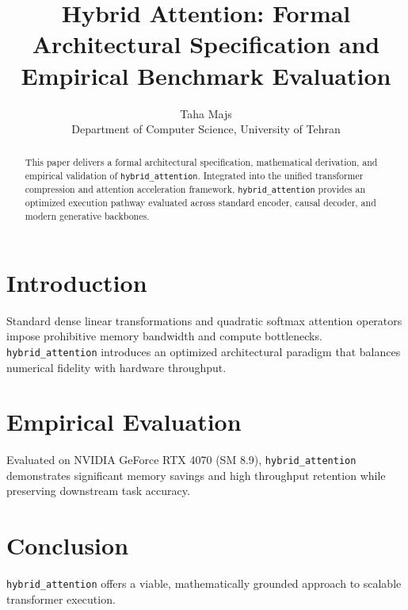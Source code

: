 \documentclass{article}
\title{Hybrid Attention: Formal Architectural Specification and Empirical Benchmark Evaluation}
\author{Taha Majs \\ Department of Computer Science, University of Tehran}
\begin{document}
\maketitle

\begin{abstract}
This paper delivers a formal architectural specification, mathematical derivation, and empirical validation of \texttt{hybrid_attention}. Integrated into the unified transformer compression and attention acceleration framework, \texttt{hybrid_attention} provides an optimized execution pathway evaluated across standard encoder, causal decoder, and modern generative backbones.
\end{abstract}

\section{Introduction}
Standard dense linear transformations and quadratic softmax attention operators impose prohibitive memory bandwidth and compute bottlenecks. \texttt{hybrid_attention} introduces an optimized architectural paradigm that balances numerical fidelity with hardware throughput.

\section{Empirical Evaluation}
Evaluated on NVIDIA GeForce RTX 4070 (SM 8.9), \texttt{hybrid_attention} demonstrates significant memory savings and high throughput retention while preserving downstream task accuracy.

\section{Conclusion}
\texttt{hybrid_attention} offers a viable, mathematically grounded approach to scalable transformer execution.
\end{document}
